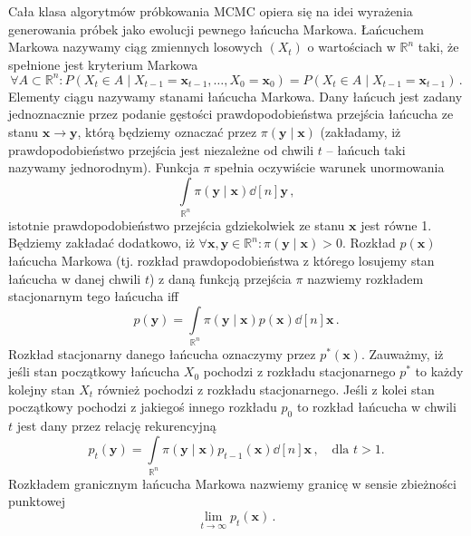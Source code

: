 \documentclass{myclass}
\begin{document}
Cała klasa algorytmów próbkowania MCMC opiera się na idei wyrażenia generowania próbek jako ewolucji
pewnego łańcucha Markowa. Łańcuchem Markowa nazywamy ciąg zmiennych losowych \((X_t)\) o wartościach
w \(\mathbb{R}^n\) taki, że spełnione jest kryterium Markowa
\begin{equation*}
    \forall A \subset \mathbb{R}^n: P(X_t \in A \mid X_{t-1} = \mathbf{x}_{t-1}, \ldots, X_0 = \mathbf{x}_0) = P(X_t \in A \mid X_{t-1} = \mathbf{x}_{t-1})\,.
\end{equation*}
Elementy ciągu nazywamy stanami łańcucha Markowa. Dany łańcuch jest zadany jednoznacznie przez
podanie gęstości prawdopodobieństwa przejścia łańcucha ze stanu \(\mathbf{x} \to \mathbf{y}\), którą
będziemy oznaczać przez \(\pi(\mathbf{y} \mid \mathbf{x})\) (zakładamy, iż prawdopodobieństwo
przejścia jest niezależne od chwili \(t\) -- łańcuch taki nazywamy jednorodnym). Funkcja \(\pi\)
spełnia oczywiście warunek unormowania
\begin{equation*}
    \int\limits_{\mathbb{R}^n} \pi(\mathbf{y} \mid \mathbf{x}) \dd[n]{\mathbf{y}}\,,
\end{equation*} 
istotnie prawdopodobieństwo przejścia gdziekolwiek ze stanu \(\mathbf{x}\) jest równe 1. Będziemy
zakładać dodatkowo, iż \(\forall \mathbf{x},\mathbf{y}\in\mathbb{R}^n: \pi(\mathbf{y} \mid
\mathbf{x}) > 0\). Rozkład \(p(\mathbf{x})\) łańcucha Markowa (tj. rozkład prawdopodobieństwa z
którego losujemy stan łańcucha w danej chwili \(t\)) z daną funkcją przejścia \(\pi\) nazwiemy
rozkładem stacjonarnym tego łańcucha iff
\begin{equation*}
    p(\mathbf{y}) = \int\limits_{\mathbb{R}^n} \pi(\mathbf{y} \mid \mathbf{x})p(\mathbf{x}) \dd[n]{\mathbf{x}}\,.
\end{equation*}
Rozkład stacjonarny danego łańcucha oznaczymy przez \(p^*(\mathbf{x})\). Zauważmy, iż jeśli stan
początkowy łańcucha \(X_0\) pochodzi z rozkładu stacjonarnego \(p^*\) to każdy kolejny stan \(X_t\)
również pochodzi z rozkładu stacjonarnego. Jeśli z kolei stan początkowy pochodzi z jakiegoś innego
rozkładu \(p_0\) to rozkład łańcucha w chwili \(t\) jest dany przez relację rekurencyjną
\begin{equation*}
    p_t(\mathbf{y}) = \int\limits_{\mathbb{R}^n} \pi(\mathbf{y} \mid \mathbf{x})p_{t-1}(\mathbf{x}) \dd[n]{\mathbf{x}}\,,\quad\text{dla \(t > 1\).}
\end{equation*}
Rozkładem granicznym łańcucha Markowa nazwiemy granicę w sensie zbieżności punktowej
\begin{equation*}
    \lim_{t\to\infty} p_t(\mathbf{x})\,.
\end{equation*}
\end{document}
